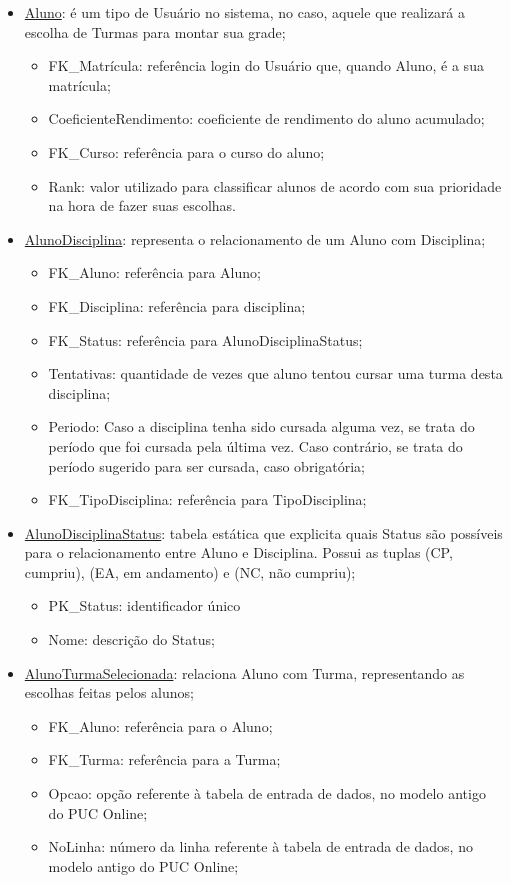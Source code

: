 \documentclass[graduacao,brazil]{ThesisPUC}
\begin{document}
\begin{itemize}

	\item \underline{Aluno}: é um tipo de Usuário no sistema, no caso, aquele que realizará a escolha de Turmas para montar sua grade;
	\begin{itemize}
		\item FK\_Matrícula: referência login do Usuário que, quando Aluno, é a sua matrícula;
		\item CoeficienteRendimento: coeficiente de rendimento do aluno acumulado;
		\item FK\_Curso: referência para o curso do aluno;
		\item Rank: valor utilizado para classificar alunos de acordo com sua prioridade na hora de fazer suas escolhas.
	\end{itemize}

	\item \underline{AlunoDisciplina}: representa o relacionamento de um Aluno com Disciplina;
	\begin{itemize}
		\item FK\_Aluno: referência para Aluno;
		\item FK\_Disciplina: referência para disciplina;
		\item FK\_Status: referência para AlunoDisciplinaStatus;
		\item Tentativas: quantidade de vezes que aluno tentou cursar uma turma desta disciplina;
		\item Periodo: Caso a disciplina tenha sido cursada alguma vez, se trata do período que foi cursada pela última vez. Caso contrário, se trata do período sugerido para ser cursada, caso obrigatória;
		\item FK\_TipoDisciplina: referência para TipoDisciplina;
	\end{itemize}

	\item \underline{AlunoDisciplinaStatus}: tabela estática que explicita quais Status são possíveis para o relacionamento entre Aluno e Disciplina. Possui as tuplas (CP, cumpriu), (EA, em andamento) e (NC, não cumpriu);
	\begin{itemize}
		\item PK\_Status: identificador único
		\item Nome: descrição do Status;
	\end{itemize}

	\item \underline{AlunoTurmaSelecionada}: relaciona Aluno com Turma, representando as escolhas feitas pelos alunos;
	\begin{itemize}
		\item FK\_Aluno: referência para o Aluno;
		\item FK\_Turma: referência para a Turma;
		\item Opcao: opção referente à tabela de entrada de dados, no modelo antigo do PUC Online;
		\item NoLinha: número da linha referente à tabela de entrada de dados, no modelo antigo do PUC Online;
	\end{itemize}


\end{itemize}
\end{document}
